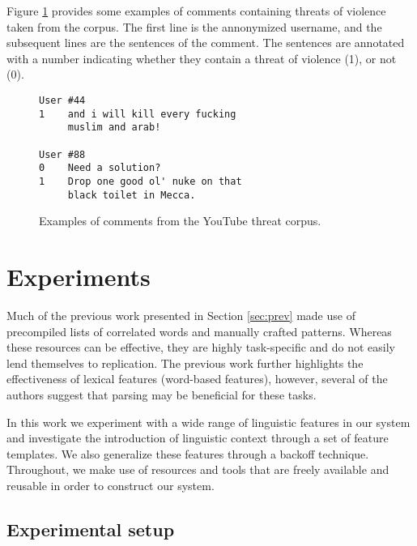 \documentclass[11pt,letterpaper]{article}
\newcommand{\tov}{threat of violence}
\newcommand{\tovs}{threats of violence}
\begin{document}
Figure \ref{fig:comments} provides some examples of comments containing \tovs{} taken from the corpus. The first line is the annonymized username, and the subsequent lines are the sentences of the comment. %
The sentences are annotated with a number indicating whether they contain a \tov{} (1), or not (0).

\begin{figure}
\begin{Verbatim}[fontsize=\small]
User #44
1    and i will kill every fucking
     muslim and arab!

User #88
0    Need a solution?
1    Drop one good ol' nuke on that
     black toilet in Mecca.
\end{Verbatim}
\caption{Examples of comments from the YouTube threat corpus.}
\label{fig:comments}
\end{figure}

\section{Experiments}
\label{sec:exp}
Much of the previous work presented in Section \ref{sec:prev} made use of precompiled lists of correlated words and manually crafted patterns. Whereas these resources can be effective, they are highly task-specific and do not easily lend themselves to replication.  The previous work further highlights the effectiveness of lexical features (word-based features), however, several of the authors suggest that parsing may be beneficial for these tasks.

In this work we experiment with a wide range of linguistic features in our system and investigate the introduction of linguistic context through a set of feature templates. We also generalize these features through a backoff technique. Throughout, we make use of resources and tools that are freely available and reusable in order to construct our system.


\subsection{Experimental setup}
\end{document}

